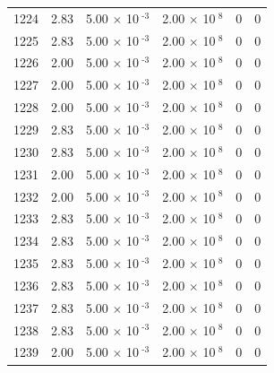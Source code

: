\documentclass[a4paper,11pt]{article}
\begin{document}
\begin{center}
\begin{longtable}{|R{1.5cm}|R{2.4cm}|R{2.4cm}|R{2.4cm}|R{2.4cm}|R{2.4cm}|}
 1224 &   2.83  &         5.00 $\times$ 10$^{\text{          -3}}$  &         2.00 $\times$ 10$^{\text{           8}}$  & 0  & 0 \\
 1225 &   2.83  &         5.00 $\times$ 10$^{\text{          -3}}$  &         2.00 $\times$ 10$^{\text{           8}}$  & 0  & 0 \\
 1226 &   2.00  &         5.00 $\times$ 10$^{\text{          -3}}$  &         2.00 $\times$ 10$^{\text{           8}}$  & 0  & 0 \\
 1227 &   2.00  &         5.00 $\times$ 10$^{\text{          -3}}$  &         2.00 $\times$ 10$^{\text{           8}}$  & 0  & 0 \\
 1228 &   2.00  &         5.00 $\times$ 10$^{\text{          -3}}$  &         2.00 $\times$ 10$^{\text{           8}}$  & 0  & 0 \\
 1229 &   2.83  &         5.00 $\times$ 10$^{\text{          -3}}$  &         2.00 $\times$ 10$^{\text{           8}}$  & 0  & 0 \\
 1230 &   2.83  &         5.00 $\times$ 10$^{\text{          -3}}$  &         2.00 $\times$ 10$^{\text{           8}}$  & 0  & 0 \\
 1231 &   2.00  &         5.00 $\times$ 10$^{\text{          -3}}$  &         2.00 $\times$ 10$^{\text{           8}}$  & 0  & 0 \\
 1232 &   2.00  &         5.00 $\times$ 10$^{\text{          -3}}$  &         2.00 $\times$ 10$^{\text{           8}}$  & 0  & 0 \\
 1233 &   2.83  &         5.00 $\times$ 10$^{\text{          -3}}$  &         2.00 $\times$ 10$^{\text{           8}}$  & 0  & 0 \\
 1234 &   2.83  &         5.00 $\times$ 10$^{\text{          -3}}$  &         2.00 $\times$ 10$^{\text{           8}}$  & 0  & 0 \\
 1235 &   2.83  &         5.00 $\times$ 10$^{\text{          -3}}$  &         2.00 $\times$ 10$^{\text{           8}}$  & 0  & 0 \\
 1236 &   2.83  &         5.00 $\times$ 10$^{\text{          -3}}$  &         2.00 $\times$ 10$^{\text{           8}}$  & 0  & 0 \\
 1237 &   2.83  &         5.00 $\times$ 10$^{\text{          -3}}$  &         2.00 $\times$ 10$^{\text{           8}}$  & 0  & 0 \\
 1238 &   2.83  &         5.00 $\times$ 10$^{\text{          -3}}$  &         2.00 $\times$ 10$^{\text{           8}}$  & 0  & 0 \\
 1239 &   2.00  &         5.00 $\times$ 10$^{\text{          -3}}$  &         2.00 $\times$ 10$^{\text{           8}}$  & 0  & 0 \\

\end{longtable}
\end{center}
\end{document}
